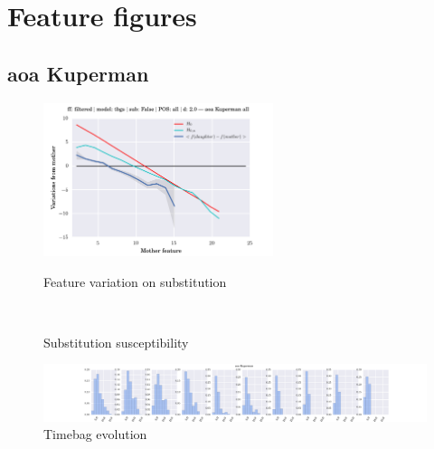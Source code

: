 \clearpage
\onecolumn
\appendix
\section{Feature figures}


\subsection{aoa Kuperman}
\begin{figure}[h!]
    \centering
    \includegraphics[width=0.6\textwidth]{images/feature-cards/aoa_Kuperman/feature_variations.png}
    \caption{Feature variation on substitution}
	~
	\caption{Substitution susceptibility}
    \includegraphics[width=\textwidth]{images/feature-cards/aoa_Kuperman/timebags_evolution-hist.png}
	\caption{Timebag evolution}
\end{figure}


